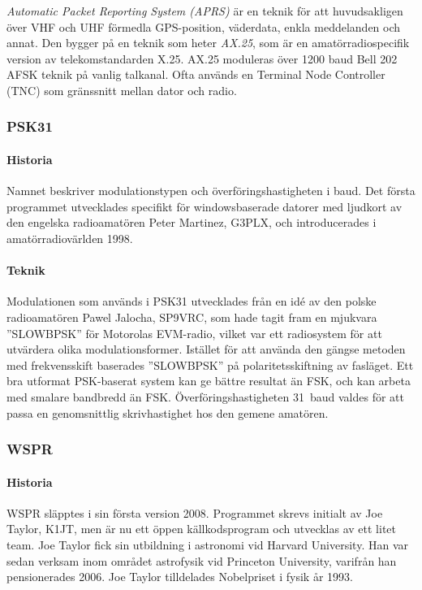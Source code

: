 \emph{Automatic Packet Reporting System (APRS)} är en teknik för att
huvudsakligen över VHF och UHF förmedla GPS-position, väderdata, enkla
meddelanden och annat.
Den bygger på en teknik som heter \emph{AX.25}, som är en amatörradiospecifik
version av telekomstandarden X.25.
AX.25 moduleras över 1200 baud Bell 202 AFSK teknik på vanlig talkanal.
Ofta används en Terminal Node Controller (TNC) som gränssnitt mellan dator och
radio.

\subsubsection{PSK31}
\label{modulation_psk31}

\paragraph{Historia}

Namnet beskriver modulationstypen och överföringshastigheten i baud.
Det första programmet utvecklades specifikt för windowsbaserade datorer med
ljudkort av den engelska radioamatören Peter Martinez, G3PLX, och
introducerades i amatörradiovärlden 1998.

\paragraph{Teknik}

Modulationen som används i PSK31 utvecklades från en idé av den polske
radioamatören Pawel Jalocha, SP9VRC, som hade tagit fram en mjukvara
''SLOWBPSK'' för Motorolas EVM-radio, vilket var ett radiosystem för att
utvärdera olika modulationsformer.
Istället för att använda den gängse metoden med frekvensskift baserades
''SLOWBPSK'' på polaritetsskiftning av fasläget.
Ett bra utformat PSK-baserat system kan ge bättre resultat än FSK, och kan
arbeta med smalare bandbredd än FSK.
Överföringshastigheten 31~baud valdes för att passa en genomsnittlig
skrivhastighet hos den gemene amatören.

\subsubsection{WSPR}

\paragraph{Historia}

WSPR släpptes i sin första version 2008.
Programmet skrevs initialt av Joe Taylor, K1JT, men är nu ett öppen
källkodsprogram och utvecklas av ett litet team.
Joe Taylor fick sin utbildning i astronomi vid Harvard University.
Han var sedan verksam inom området astrofysik vid Princeton University,
varifrån han pensionerades 2006.
Joe Taylor tilldelades Nobelpriset i fysik år 1993.

